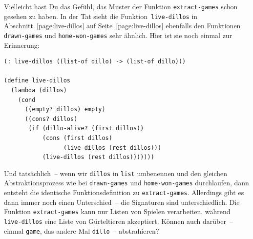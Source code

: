 Vielleicht hast Du das Gefühl, das Muster der Funktion
\lstinline{extract-games} schon gesehen zu haben.  In der Tat sieht
die Funktion~\lstinline{live-dillos} in
Abschnitt~\ref{page:live-dillos} auf
Seite~\ref{page:live-dillos} ebenfalls den Funktionen
\lstinline{drawn-games} und \lstinline{home-won-games} sehr ähnlich.
Hier ist sie noch einmal zur Erinnerung:
%
\begin{lstlisting}
(: live-dillos ((list-of dillo) -> (list-of dillo)))

(define live-dillos
  (lambda (dillos)
    (cond
      ((empty? dillos) empty)
      ((cons? dillos)
       (if (dillo-alive? (first dillos))
           (cons (first dillos)
                 (live-dillos (rest dillos)))
           (live-dillos (rest dillos)))))))
\end{lstlisting}
%
Und tatsächlich~-- wenn wir \lstinline{dillos} in \lstinline{list}
umbenennen und den gleichen Abstraktionsprozess wie bei
\lstinline{drawn-games} und \lstinline{home-won-games} durchlaufen,
dann entsteht die identische Funktionsdefinition zu
\lstinline{extract-games}.  Allerdings gibt es dann immer noch einen
Unterschied~-- die Signaturen sind unterschiedlich.
Die Funktion \lstinline{extract-games} kann nur Listen von Spielen
verarbeiten, während \lstinline{live-dillos} eine Liste von
Gürteltieren akzeptiert.  Können auch darüber~-- einmal
\lstinline{game}, das andere Mal \lstinline{dillo}~-- abstrahieren?

